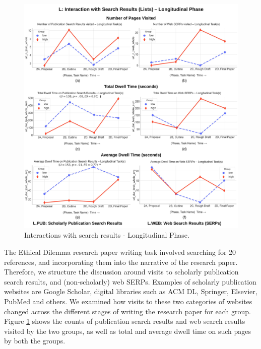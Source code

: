 \documentclass[letterpaper, nobind]{templates/ociamthesis}
\begin{document}
\begin{figure}

{\centering \includegraphics[width=1\linewidth]{figs/rp2-l} 

}

\caption[Interactions with search results - Longitudinal Phase.]{Interactions with search results - Longitudinal Phase.}\label{fig:rp2-l}
\end{figure}





The Ethical Dilemma research paper writing task involved searching for 20 references, and incorporating them into the narrative of the research paper.
Therefore, we structure the discussion around visits to scholarly publication search results, and (non-scholarly) web SERPs.
Examples of scholarly publication websites are Google Scholar, digital libraries such as ACM DL, Springer, Elsevier, PubMed and others.
We examined how visits to these two categories of websites changed across the different stages of writing the research paper for each group.
Figure \ref{fig:rp2-l} shows the counts of publication search results and web search results visited by the two groups, as well as total and average dwell time on such pages by both the groups.
\end{document}
